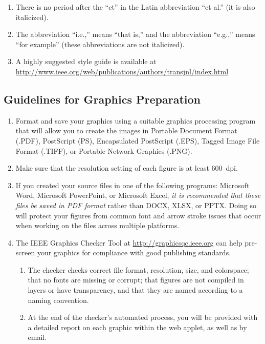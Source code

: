 \begin{enumerate}
	\item There is no period after the ``et'' in the Latin abbreviation ``et al.'' (it is also italicized). 
	
	\item The abbreviation ``i.e.,'' means ``that is,'' and the abbreviation ``e.g.,'' means ``for example'' (these abbreviations are not italicized).
	
	\item A highly suggested style guide is available at \url{http://www.ieee.org/web/publications/authors/transjnl/index.html}

\end{enumerate}



\subsection{Guidelines for Graphics Preparation}

\begin{enumerate}
	\item Format and save your graphics using a suitable graphics processing program that will allow you to create the images in Portable Document Format (.PDF), PostScript (PS), Encapsulated PostScript (.EPS), Tagged Image File Format (.TIFF), or Portable Network Graphics (.PNG). 
	
	\item Make sure that the resolution setting of each figure is at least 600~dpi. 
	
	\item If you created your source files in one of the following programs: Microsoft Word, Microsoft PowerPoint, or Microsoft Excel, \emph{it is recommended that these files be saved in PDF format} rather than DOCX, XLSX, or PPTX. Doing so will protect your figures from common font and arrow stroke issues that occur when working on the files across multiple platforms. 
	
	\item The IEEE Graphics Checker Tool at \url{http://graphicsqc.ieee.org} can help pre-screen your graphics for compliance with good publishing standards. 
	
	\begin{enumerate}
		\item The checker checks correct file format, resolution, size, and colorspace; that no fonts are missing or corrupt; that figures are not compiled in layers or have transparency, and that they are named according to a naming convention.
		
		\item At the end of the checker's automated process, you will be provided with a detailed report on each graphic within the web applet, as well as by email.
	\end{enumerate}
	
\end{enumerate}





